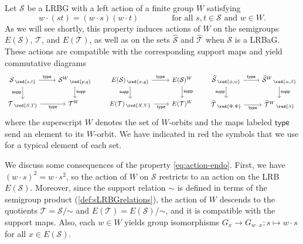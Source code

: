 \documentclass[11pt, oneside, reqno]{amsart}
\theoremstyle{definition}
\numberwithin{equation}{section}
\def \SS{{\mathcal{S}}}
\def \TT{{\mathcal{T}}}
\def \wh{\widehat}
\def \supp{\mathsf{supp}}
\def \type{\mathsf{type}}
\begin{document}
Let $\SS$ be a LRBG with a left action of a finite group $W$ satisfying
\begin{equation}\label{eq:action-endo}
    w \cdot (s t) = (w \cdot s)(w \cdot t)
    \qquad\qquad
    \text{for all $s,t \in \SS$ and $w \in W$.}
\end{equation}
As we will see shortly, this property induces actions of $W$ on the semigroups $E(\SS)$, $\TT$, and $E(\TT)$,
as well as on the sets $\wh{\SS}$ and $\wh{\TT}$ when $\SS$ is a LRBaG.
These actions are compatible with the corresponding support maps and yield commutative diagrams
\begin{equation}\label{eq:typesuppDiagrams}
    \begin{tikzcd}
        {{\SS}\,\,\!_{\red{s,t}}} \arrow[d, "\supp"'] \arrow[r, "\type"] & {{\SS}^W\,\,\!_{\red{p,q}}} \arrow[d, "\supp"] \\
        {{\TT}\,\,\!_{\red{S,T}}} \arrow[r, "\type"']                    & {{\TT}^W\,\,\!_{\,}}                          
    \end{tikzcd}
    \hspace{2em}
    \begin{tikzcd}
    E(\SS)\,\,\!_{\red{x,y}} \arrow[r, "\type"] \arrow[d, "\supp"']         &       E(\SS)^W \arrow[d, "\supp"] \\
    E(\TT)\,\,\!_{\red{X,Y}} \arrow[r, "\type"']                              &       E(\TT)^W
    \end{tikzcd}
    \hspace{2em}
    \begin{tikzcd}
        {\wh{\SS}\,\,\!_{\red{\phi,\psi}}} \arrow[d, "\supp"'] \arrow[r, "\type"] & {\wh{\SS}^W\,\,\!_{\red{\alpha,\beta}}} \arrow[d, "\supp"] \\
        {\wh{\TT}\,\,\!_{\red{\Phi,\Psi}}} \arrow[r, "\type"']                    & {\wh{\TT}^W\,\,\!_{\red{\lambda}}}
    \end{tikzcd}
\end{equation}
where the superscript $W$ denotes the set of $W$-orbits and the maps labeled
$\type$ send an element to its $W$-orbit. We have indicated in red the symbols
that we use for a typical element of each set.

We discuss some consequences of the property \cref{eq:action-endo}.
First, we have $(w \cdot s)^2 = w \cdot s^2$, so the action of $W$ on $\SS$ restricts to an action on the LRB $E(\SS)$.
Moreover, since the support relation $\sim$ is defined in terms of the semigroup product (\cref{def:sLRBGrelations}),
the action of $W$ descends to the quotients $\TT = \SS/\mathord{\sim}$ and $E(\TT) = E(\SS)/\mathord{\sim}$, and it is compatible with the support maps.
Also, each $w \in W$ yields group isomorphisms $G_x \to G_{w \cdot x} : s \mapsto w \cdot s$ for all $x \in E(\SS)$.
\end{document}
